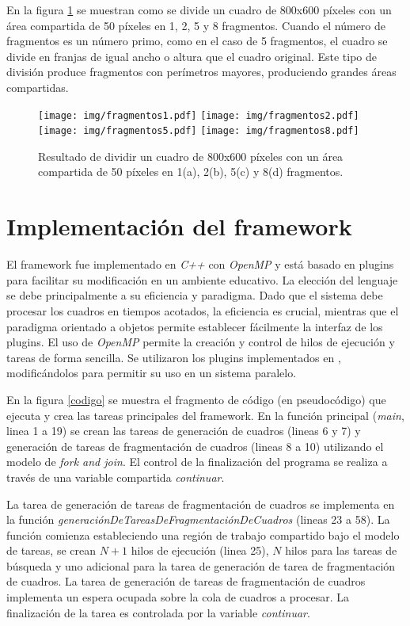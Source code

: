 En la figura \ref{fragmentos} se muestran como se divide un cuadro de 800x600
píxeles con un área compartida de 50 píxeles en 1, 2, 5 y 8 fragmentos. Cuando
el número de fragmentos es un número primo, como en el caso de 5 fragmentos, el
cuadro se divide en franjas de igual ancho o altura que el cuadro original. Este
tipo de división produce fragmentos con perímetros mayores, produciendo grandes
áreas compartidas.

\begin{figure}[!h]

	\texttt{[image: img/fragmentos1.pdf]}
	\texttt{[image: img/fragmentos2.pdf]}
	\texttt{[image: img/fragmentos5.pdf]}
	\texttt{[image: img/fragmentos8.pdf]}
	\caption{Resultado de dividir un cuadro de 800x600 píxeles con un área
	compartida de 50 píxeles en 1(a), 2(b), 5(c) y 8(d) fragmentos.}
	\label{fragmentos}

\end{figure}

\section{Implementación del framework}

El framework fue implementado en \emph{C++} con \emph{OpenMP} y está basado en
plugins para facilitar su modificación en un ambiente educativo. La elección del
lenguaje se debe principalmente a su eficiencia y paradigma. Dado que el sistema
debe procesar los cuadros en tiempos acotados, la eficiencia es crucial,
mientras que el paradigma orientado a objetos permite establecer fácilmente la
interfaz de los plugins. El uso de \emph{OpenMP} permite la creación y control
de hilos de ejecución y tareas de forma sencilla. Se utilizaron los plugins
implementados en \cite{torres2014}, modificándolos para permitir su uso en un
sistema paralelo.

En la figura \ref{codigo} se muestra el fragmento de código (en pseudocódigo)
que ejecuta y crea las tareas principales del framework. En la función principal
(\emph{main}, linea 1 a 19) se crean las tareas de generación de cuadros (lineas
6 y 7) y generación de tareas de fragmentación de cuadros (lineas 8 a 10)
utilizando el modelo de \emph{fork and join}. El control de la finalización del
programa se realiza a través de una variable compartida \emph{continuar}.

La tarea de generación de tareas de fragmentación de cuadros se implementa en la
función \emph{generaciónDeTareasDeFragmentaciónDeCuadros} (lineas 23 a 58). La
función comienza estableciendo una región de trabajo compartido bajo el modelo
de tareas, se crean $N+1$ hilos de ejecución (linea 25), $N$ hilos para las
tareas de búsqueda y uno adicional para la tarea de generación de tarea de
fragmentación de cuadros. La tarea de generación de tareas de fragmentación de
cuadros implementa un espera ocupada sobre la cola de cuadros a procesar. La
finalización de la tarea es controlada por la variable \emph{continuar}.

